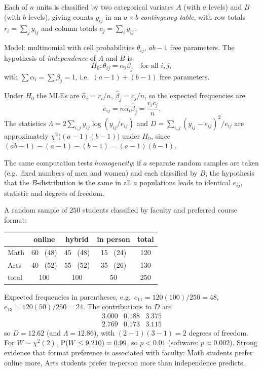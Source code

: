 Each of $n$ units is classified by two categorical variates $A$ (with $a$ levels) and $B$
(with $b$ levels), giving counts $y_{ij}$ in an $a\times b$ \emph{contingency table}, with
row totals $r_i = \sum_j y_{ij}$ and column totals $c_j = \sum_i y_{ij}$.

Model: multinomial with cell probabilities $\theta_{ij}$, $ab-1$ free parameters.
The hypothesis of \emph{independence} of $A$ and $B$ is
\[
H_0:\theta_{ij} = \alpha_i\beta_j\quad\text{for all } i,j,
\]
with $\sum\alpha_i = \sum\beta_j = 1$, i.e.\ $(a-1)+(b-1)$ free parameters.

\begin{theorem}
Under $H_0$ the MLEs are $\hat\alpha_i = r_i/n$, $\hat\beta_j = c_j/n$, so the expected
frequencies are
\[
e_{ij} = n\hat\alpha_i\hat\beta_j = \frac{r_i c_j}{n}.
\]
The statistics $\Lambda = 2\sum_{i,j}y_{ij}\log(y_{ij}/e_{ij})$ and
$D = \sum_{i,j}(y_{ij}-e_{ij})^2/e_{ij}$ are approximately $\chi^2\big((a-1)(b-1)\big)$ under
$H_0$, since $(ab-1) - (a-1) - (b-1) = (a-1)(b-1)$.
\end{theorem}

\begin{remark}
The same computation tests \emph{homogeneity}: if $a$ separate random samples are taken
(e.g.\ fixed numbers of men and women) and each classified by $B$, the hypothesis that the
$B$-distribution is the same in all $a$ populations leads to identical $e_{ij}$, statistic
and degrees of freedom.
\end{remark}

\begin{example}
A random sample of $250$ students classified by faculty and preferred course format:
\begin{center}
\begin{tabular}{lcccc}
\toprule
 & online & hybrid & in person & total\\
\midrule
Math & 60 \ (48) & 45 \ (48) & 15 \ (24) & 120\\
Arts & 40 \ (52) & 55 \ (52) & 35 \ (26) & 130\\
\midrule
total & 100 & 100 & 50 & 250\\
\bottomrule
\end{tabular}
\end{center}
Expected frequencies in parentheses, e.g.\ $e_{11} = 120(100)/250 = 48$,
$e_{13} = 120(50)/250 = 24$. The contributions to $D$ are
\[
\begin{array}{ccc}
3.000 & 0.188 & 3.375\\
2.769 & 0.173 & 3.115
\end{array}
\]
so $D = 12.62$ (and $\Lambda = 12.86$), with $(2-1)(3-1) = 2$ degrees of freedom. For
$W\sim\chi^2(2)$, $\operatorname{P}(W\le 9.210) = 0.99$, so $p<0.01$ (software: $p\approx0.002$). Strong
evidence that format preference is associated with faculty: Math students prefer online
more, Arts students prefer in-person more than independence predicts.
\end{example}

